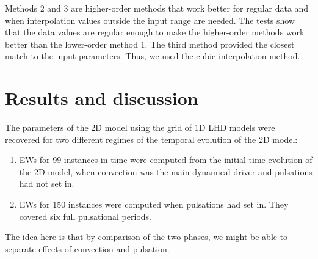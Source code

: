 \documentclass{aa}
\begin{document}
Methods 2 and 3 are higher-order methods that work
better for regular data and when interpolation 
values outside the input range are needed.
The tests show that the data values 
are regular enough to make the higher-order
methods work better than the lower-order method 1.
The third method provided the closest match to the input parameters.  
Thus, we used the
cubic interpolation method.


\section{Results and discussion}
The parameters of the 2D model using the grid of 1D LHD
models were recovered for two different regimes of the temporal evolution of the 2D
model:
\begin{enumerate}
\item EWs for 99 instances in time were computed from  
the initial time evolution 
of the 2D model, 
when convection was the main dynamical 
driver and pulsations had not set in.
\item EWs for 150 instances were computed when pulsations 
had set in. They covered six full pulsational periods.
\end{enumerate}
The idea here is that by comparison of the two phases, we might be able to
separate effects of convection and pulsation.
\end{document}
